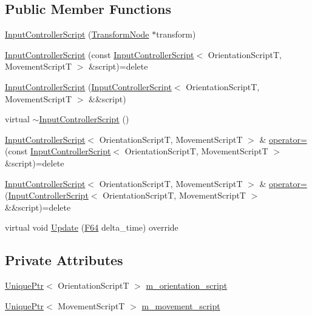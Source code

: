 \subsection*{Public Member Functions}
\begin{DoxyCompactItemize}
\item 
\hyperlink{classmage_1_1_input_controller_script_adf1edb71170cb5184f201a64ad7455cb}{Input\+Controller\+Script} (\hyperlink{structmage_1_1_transform_node}{Transform\+Node} $\ast$transform)
\item 
\hyperlink{classmage_1_1_input_controller_script_a22de786b39180e18b8565b211797388d}{Input\+Controller\+Script} (const \hyperlink{classmage_1_1_input_controller_script}{Input\+Controller\+Script}$<$ Orientation\+ScriptT, Movement\+ScriptT $>$ \&script)=delete
\item 
\hyperlink{classmage_1_1_input_controller_script_a18b905c7a204c22173dcaf19a9587f7d}{Input\+Controller\+Script} (\hyperlink{classmage_1_1_input_controller_script}{Input\+Controller\+Script}$<$ Orientation\+ScriptT, Movement\+ScriptT $>$ \&\&script)
\item 
virtual \hyperlink{classmage_1_1_input_controller_script_ac5699d9a4d9a3f9c456885a92dede979}{$\sim$\+Input\+Controller\+Script} ()
\item 
\hyperlink{classmage_1_1_input_controller_script}{Input\+Controller\+Script}$<$ Orientation\+ScriptT, Movement\+ScriptT $>$ \& \hyperlink{classmage_1_1_input_controller_script_a747a0a1cb4064a5b8580195c0a53b887}{operator=} (const \hyperlink{classmage_1_1_input_controller_script}{Input\+Controller\+Script}$<$ Orientation\+ScriptT, Movement\+ScriptT $>$ \&script)=delete
\item 
\hyperlink{classmage_1_1_input_controller_script}{Input\+Controller\+Script}$<$ Orientation\+ScriptT, Movement\+ScriptT $>$ \& \hyperlink{classmage_1_1_input_controller_script_a2e2231433ec17577ce019348285eaba3}{operator=} (\hyperlink{classmage_1_1_input_controller_script}{Input\+Controller\+Script}$<$ Orientation\+ScriptT, Movement\+ScriptT $>$ \&\&script)=delete
\item 
virtual void \hyperlink{classmage_1_1_input_controller_script_a066cd5ed9ef4d05e4442f42e372c9f2d}{Update} (\hyperlink{namespacemage_ad26233bbec640deda836e572c1a23708}{F64} delta\+\_\+time) override
\end{DoxyCompactItemize}
\subsection*{Private Attributes}
\begin{DoxyCompactItemize}
\item 
\hyperlink{namespacemage_a3316d7143a973e37adf1110f2e80ca31}{Unique\+Ptr}$<$ Orientation\+ScriptT $>$ \hyperlink{classmage_1_1_input_controller_script_ab5af05a3bf7cdd672382dd5bcb1d6d02}{m\+\_\+orientation\+\_\+script}
\item 
\hyperlink{namespacemage_a3316d7143a973e37adf1110f2e80ca31}{Unique\+Ptr}$<$ Movement\+ScriptT $>$ \hyperlink{classmage_1_1_input_controller_script_aea0478602dbabf616dd3ef8b4408a42a}{m\+\_\+movement\+\_\+script}
\end{DoxyCompactItemize}
